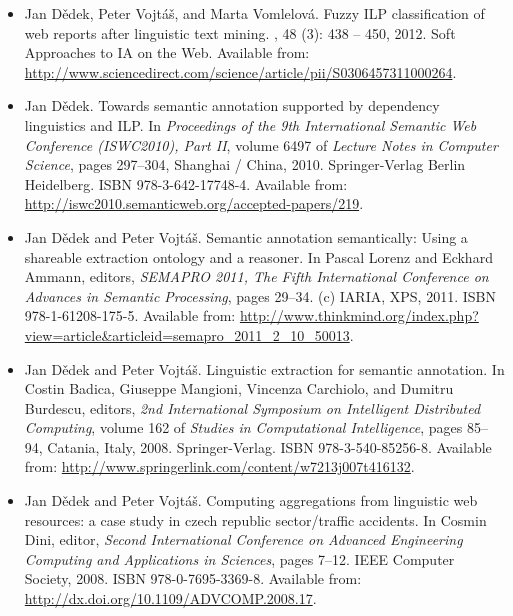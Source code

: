 \documentclass[12pt,a4paper,twoside,notitlepage]{article}
\begin{document}
\begin{itemize}


\item
Jan D{\v{e}}dek, Peter Vojt{\'{a}}{\v{s}}, and Marta Vomlelov{\'{a}}.
\newblock Fuzzy {ILP} classification of web reports after linguistic text
  mining.
, 48 (3):
  438 -- 450, 2012.
\newblock Soft Approaches to IA on the Web.
\newblock Available from:
  \url{http://www.sciencedirect.com/science/article/pii/S0306457311000264}.


\item
Jan D{\v{e}}dek.
\newblock Towards semantic annotation supported by dependency linguistics and
  {ILP}.
\newblock In {\em Proceedings of the 9th International Semantic Web Conference
  (ISWC2010), Part II}, volume 6497 of {\em Lecture Notes in Computer Science},
  pages 297--304, Shanghai / China, 2010. Springer-Verlag Berlin Heidelberg.
\newblock ISBN 978-3-642-17748-4.
\newblock Available from:
  \url{http://iswc2010.semanticweb.org/accepted-papers/219}.

\item
Jan D{\v{e}}dek and Peter Vojt{\'{a}}{\v{s}}.
\newblock Semantic annotation semantically: Using a shareable extraction
  ontology and a reasoner.
\newblock In Pascal Lorenz and Eckhard Ammann, editors, {\em {SEMAPRO 2011},
  The Fifth International Conference on Advances in Semantic Processing}, pages
  29--34. (c) {IARIA}, {XPS}, 2011.
\newblock ISBN 978-1-61208-175-5.
\newblock Available from:
  \url{http://www.thinkmind.org/index.php?view=article&articleid=semapro_2011_2_10_50013}.



\item
Jan D{\v{e}}dek and Peter Vojt{\'{a}}{\v{s}}.
\newblock Linguistic extraction for semantic annotation.
\newblock In Costin Badica, Giuseppe Mangioni, Vincenza Carchiolo, and Dumitru
  Burdescu, editors, {\em 2nd International Symposium on Intelligent
  Distributed Computing}, volume 162 of {\em Studies in Computational
  Intelligence}, pages 85--94, Catania, Italy, 2008. Springer-Verlag.
\newblock ISBN 978-3-540-85256-8.
\newblock Available from:
  \url{http://www.springerlink.com/content/w7213j007t416132}.


\item
Jan D{\v{e}}dek and Peter Vojt{\'{a}}{\v{s}}.
\newblock Computing aggregations from linguistic web resources: a case study in
  czech republic sector/traffic accidents.
\newblock In Cosmin Dini, editor, {\em Second International Conference on
  Advanced Engineering Computing and Applications in Sciences}, pages 7--12.
  {IEEE} Computer Society, 2008.
\newblock ISBN 978-0-7695-3369-8.
\newblock Available from: \url{http://dx.doi.org/10.1109/ADVCOMP.2008.17}.


\end{itemize}
\end{document}
